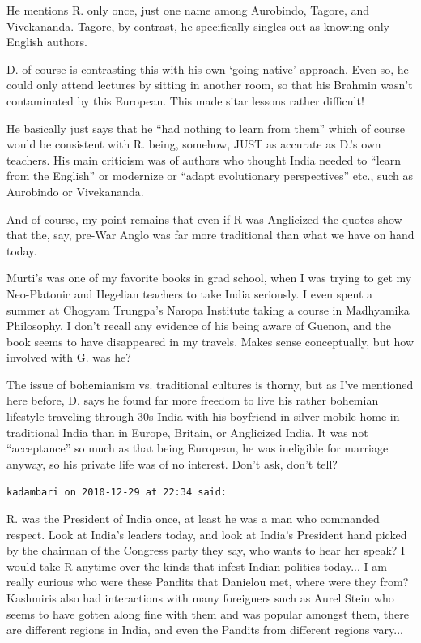 \begin{footnotesize}
\begin{sffamily}
He mentions R. only once, just one name among Aurobindo, Tagore, and Vivekananda. Tagore, by contrast, he specifically singles out as knowing only English authors.

D. of course is contrasting this with his own `going native' approach. Even so, he could only attend lectures by sitting in another room, so that his Brahmin wasn't contaminated by this European. This made sitar lessons rather difficult!

He basically just says that he ``had nothing to learn from them'' which of course would be consistent with R. being, somehow, JUST as accurate as D.'s own teachers. His main criticism was of authors who thought India needed to ``learn from the English'' or modernize or ``adapt evolutionary perspectives'' etc., such as Aurobindo or Vivekananda.

And of course, my point remains that even if R was Anglicized the quotes show that the, say, pre-War Anglo was far more traditional than what we have on hand today.

Murti's was one of my favorite books in grad school, when I was trying to get my Neo-Platonic and Hegelian teachers to take India seriously. I even spent a summer at Chogyam Trungpa's Naropa Institute taking a course in Madhyamika Philosophy. I don't recall any evidence of his being aware of Guenon, and the book seems to have disappeared in my travels. Makes sense conceptually, but how involved with G. was he?

The issue of bohemianism vs. traditional cultures is thorny, but as I've mentioned here before, D. says he found far more freedom to live his rather bohemian lifestyle traveling through 30s India with his boyfriend in silver mobile home in traditional India than in Europe, Britain, or Anglicized India. It was not ``acceptance'' so much as that being European, he was ineligible for marriage anyway, so his private life was of no interest. Don't ask, don't tell?

\hfill

\texttt{kadambari on 2010-12-29 at 22:34 said:}

R. was the President of India once, at least he was a man who commanded respect. Look at India's leaders today, and look at India's President hand picked by the chairman of the Congress party they say, who wants to hear her speak? I would take R anytime over the kinds that infest Indian politics today... I am really curious who were these Pandits that Danielou met, where were they from? Kashmiris also had interactions with many foreigners such as Aurel Stein who seems to have gotten along fine with them and was popular amongst them, there are different regions in India, and even the Pandits from different regions vary... 


\end{sffamily}
\end{footnotesize}
